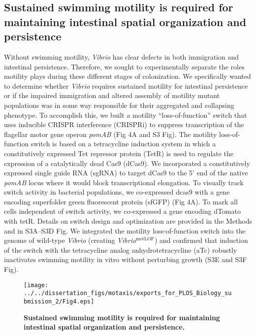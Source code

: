 \subsection{Sustained swimming motility is required for maintaining intestinal spatial organization and persistence}  
Without swimming motility, \textit{Vibrio} has clear defects in both immigration and intestinal persistence. Therefore, we sought to experimentally separate the roles motility plays during these different stages of colonization. We specifically wanted to determine whether \textit{Vibrio} requires sustained motility for intestinal persistence or if the impaired immigration and altered assembly of motility mutant populations was in some way responsible for their aggregated and collapsing phenotype. To accomplish this, we built a motility ``loss-of-function'' switch that uses inducible CRISPR interference (CRISPRi) to suppress transcription of the flagellar motor gene operon \textit{pomAB} (Fig 4A and S3 Fig). The motility loss-of-function switch is based on a tetracycline induction system in which a constitutively expressed Tet repressor protein (TetR) is used to regulate the expression of a catalytically dead Cas9 (dCas9). We incorporated a constitutively expressed single guide RNA (sgRNA) to target dCas9 to the 5' end of the native \textit{pomAB} locus where it would block transcriptional elongation. To visually track switch activity in bacterial populations, we co-expressed dcas9 with a gene encoding superfolder green fluorescent protein (sfGFP) (Fig 4A). To mark all cells independent of switch activity, we co-expressed a gene encoding dTomato with tetR. Details on switch design and optimization are provided in the Methods and in S3A–S3D Fig. We integrated the motility loss-of-function switch into the genome of wild-type \textit{Vibrio} (creating \textit{Vibrio}$^{\text{motLOF}}$) and confirmed that induction of the switch with the tetracycline analog anhydrotetracycline (aTc) robustly inactivates swimming motility in vitro without perturbing growth (S3E and S3F Fig).  

\begin{figure}[h!]
	\centerline{
		\texttt{[image: ../../dissertation\_figs/motaxis/exports\_for\_PLOS\_Biology\_submission\_2/Fig4.eps]}}
	\caption{\textbf{Sustained swimming motility is required for maintaining intestinal spatial organization and persistence.}}
\end{figure}

